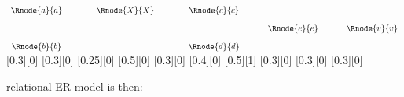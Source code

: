 \vspace{0.75cm}
\begin{center}

$
\begin{array}{c p{0.75cm} c p{0.75cm}c p{0.5cm}c p{0.5cm}c}
 \Rnode{a}{a}  && \Rnode{X}{X}  && \Rnode{c}{c}  &&              &&              \\ [0.35cm]
	 	           &&               &&               && \Rnode{e}{e} && \Rnode{v}{v} \\ [0.35cm]     
 \Rnode{b}{b}  &&               && \Rnode{d}{d}  &&              &&              \\ 
\end{array}
$
[0.3][0]
\idcomp
{}
[0.3][0]
[0.25][0]
\idcomp
{} 
[0.5][0]
[0.3][0]
\idcomp
{}
[0.4][0]
\idcomp
{}
[0.5][1]
[0.3][0]
\idcomp
\idcomp
{}
[0.3][0]
[0.3][0]
\idcomp
\end{center}
\vspace{1.0cm}
relational ER model is then:
\vspace{0.9cm}
